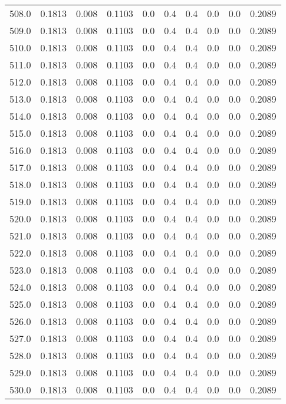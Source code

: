 \begin{longtable}{lrrrrrrrrr}
508.0 & 0.1813 & 0.008 & 0.1103 & 0.0 & 0.4 & 0.4 & 0.0 & 0.0 & 0.2089 \\
509.0 & 0.1813 & 0.008 & 0.1103 & 0.0 & 0.4 & 0.4 & 0.0 & 0.0 & 0.2089 \\
510.0 & 0.1813 & 0.008 & 0.1103 & 0.0 & 0.4 & 0.4 & 0.0 & 0.0 & 0.2089 \\
511.0 & 0.1813 & 0.008 & 0.1103 & 0.0 & 0.4 & 0.4 & 0.0 & 0.0 & 0.2089 \\
512.0 & 0.1813 & 0.008 & 0.1103 & 0.0 & 0.4 & 0.4 & 0.0 & 0.0 & 0.2089 \\
513.0 & 0.1813 & 0.008 & 0.1103 & 0.0 & 0.4 & 0.4 & 0.0 & 0.0 & 0.2089 \\
514.0 & 0.1813 & 0.008 & 0.1103 & 0.0 & 0.4 & 0.4 & 0.0 & 0.0 & 0.2089 \\
515.0 & 0.1813 & 0.008 & 0.1103 & 0.0 & 0.4 & 0.4 & 0.0 & 0.0 & 0.2089 \\
516.0 & 0.1813 & 0.008 & 0.1103 & 0.0 & 0.4 & 0.4 & 0.0 & 0.0 & 0.2089 \\
517.0 & 0.1813 & 0.008 & 0.1103 & 0.0 & 0.4 & 0.4 & 0.0 & 0.0 & 0.2089 \\
518.0 & 0.1813 & 0.008 & 0.1103 & 0.0 & 0.4 & 0.4 & 0.0 & 0.0 & 0.2089 \\
519.0 & 0.1813 & 0.008 & 0.1103 & 0.0 & 0.4 & 0.4 & 0.0 & 0.0 & 0.2089 \\
520.0 & 0.1813 & 0.008 & 0.1103 & 0.0 & 0.4 & 0.4 & 0.0 & 0.0 & 0.2089 \\
521.0 & 0.1813 & 0.008 & 0.1103 & 0.0 & 0.4 & 0.4 & 0.0 & 0.0 & 0.2089 \\
522.0 & 0.1813 & 0.008 & 0.1103 & 0.0 & 0.4 & 0.4 & 0.0 & 0.0 & 0.2089 \\
523.0 & 0.1813 & 0.008 & 0.1103 & 0.0 & 0.4 & 0.4 & 0.0 & 0.0 & 0.2089 \\
524.0 & 0.1813 & 0.008 & 0.1103 & 0.0 & 0.4 & 0.4 & 0.0 & 0.0 & 0.2089 \\
525.0 & 0.1813 & 0.008 & 0.1103 & 0.0 & 0.4 & 0.4 & 0.0 & 0.0 & 0.2089 \\
526.0 & 0.1813 & 0.008 & 0.1103 & 0.0 & 0.4 & 0.4 & 0.0 & 0.0 & 0.2089 \\
527.0 & 0.1813 & 0.008 & 0.1103 & 0.0 & 0.4 & 0.4 & 0.0 & 0.0 & 0.2089 \\
528.0 & 0.1813 & 0.008 & 0.1103 & 0.0 & 0.4 & 0.4 & 0.0 & 0.0 & 0.2089 \\
529.0 & 0.1813 & 0.008 & 0.1103 & 0.0 & 0.4 & 0.4 & 0.0 & 0.0 & 0.2089 \\
530.0 & 0.1813 & 0.008 & 0.1103 & 0.0 & 0.4 & 0.4 & 0.0 & 0.0 & 0.2089 \\

\end{longtable}
